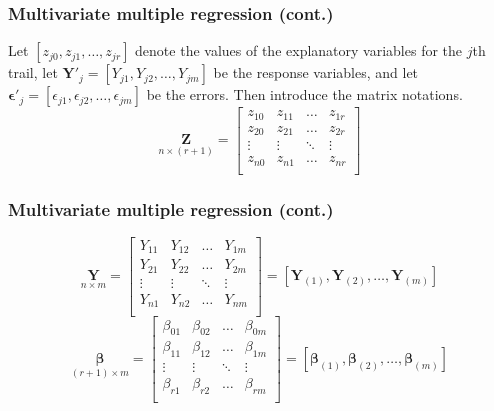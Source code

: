 \documentclass{beamer}
\begin{document}
	\begin{frame}
		\frametitle{Multivariate multiple regression (cont.)}
		Let $[ z_{ j0 }, z_{ j1 }, \dots, z_{ jr } ]$ denote the values of the explanatory variables for the $j$th trail, let $\pmb{Y}'_j = [ Y_{ j1 }, Y_{ j2 }, \dots, Y_{ jm } ]$ be the response variables, and let $\pmb{\epsilon}'_j = [ \epsilon_{ j1 }, \epsilon_{ j2 }, \dots, \epsilon_{ jm } ]$ be the errors. Then introduce the matrix notations.
		\[ \underset{ n \times ( r + 1 ) }{ \pmb{ Z } } = \begin{bmatrix}
			z_{ 10 } & z_{ 11 } & \dots & z_{ 1r } \\
			z_{ 20 } & z_{ 21 } & \dots & z_{ 2r } \\
			\vdots   & \vdots  & \ddots & \vdots \\
			z_{ n0 } & z_{ n1 } & \dots & z_{ nr } \\
		\end{bmatrix}\]
	\end{frame}
	
	\begin{frame}
		\frametitle{Multivariate multiple regression (cont.)}
		\[ \underset{ n \times m }{ \pmb{ Y } } = \begin{bmatrix}
			Y_{ 11 } & Y_{ 12 } & \dots & Y_{ 1m } \\
			Y_{ 21 } & Y_{ 22 } & \dots & Y_{ 2m } \\
			\vdots   & \vdots  & \ddots & \vdots \\
			Y_{ n1 } & Y_{ n2} & \dots & Y_{ nm } \\
		\end{bmatrix} = [ \pmb{Y}_{ ( 1 ) }, \pmb{Y}_{ ( 2 ) }, \dots, \pmb{Y}_{ ( m ) } ]\]
		\[ \underset{ ( r + 1 ) \times m }{ \pmb{ \beta } } = \begin{bmatrix}
			\beta_{ 01 } & \beta_{ 02 } & \dots & \beta_{ 0m } \\
			\beta_{ 11 } & \beta_{ 12 } & \dots & \beta_{ 1m } \\
			\vdots   & \vdots  & \ddots & \vdots \\
			\beta_{ r1 } & \beta_{ r2 } & \dots & \beta_{ rm } \\
		\end{bmatrix} = [ \pmb{ \beta }_{ ( 1 ) }, \pmb{ \beta }_{ ( 2 ) }, \dots, \pmb{ \beta }_{ ( m ) } ] \]
	\end{frame}
	
\end{document}
